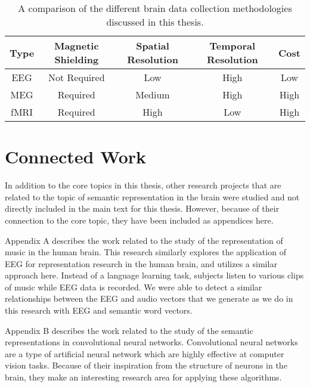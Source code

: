 \begin{table}[t]
  \begin{center}
    \def\arraystretch{1.5}
    \begin{tabular}{ |c|c|c|c|c| }
      \hline
      Type & Magnetic Shielding & Spatial Resolution & Temporal 
      Resolution & Cost \\
      \hline
      EEG & Not Required & Low & High & Low \\
      MEG & Required & Medium & High & High \\
      fMRI & Required & High & Low & High \\
      \hline
    \end{tabular}
  \end{center}
  \caption[Collection Methodologies Comparison]{
    A comparison of the different brain data collection methodologies discussed 
    in this thesis.
  }
  \label{table:modalities}
\end{table}

\section{Connected Work}

In addition to the core topics in this thesis, other research projects that are 
related to the topic of semantic representation in the brain were studied and 
not directly included in the main text for this thesis. However, because of 
their connection to the core topic, they have been included as appendices here.

Appendix A describes the work related to the study of the representation of 
music in the human brain. This research similarly explores the application of 
EEG for representation research in the human brain, and utilizes a similar 
approach here. Instead of a language learning task, subjects listen to various 
clips of music while EEG data is recorded. We were able to detect a similar 
relationships between the EEG and audio vectors that we generate as we do in 
this research with EEG and semantic word vectors.

Appendix B describes the work related to the study of the semantic 
representations in convolutional neural networks. Convolutional neural networks 
are a type of artificial neural network which are highly effective at computer 
vision tasks. Because of their inspiration from the structure of neurons in the 
brain, they make an interesting research area for applying these algorithms. 

